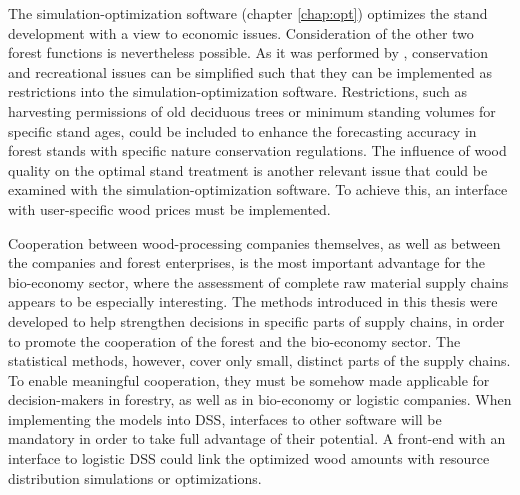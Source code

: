 The si\-mu\-la\-tion-op\-ti\-mi\-za\-tion software (chapter \ref{chap:opt}) optimizes the stand development with a view to economic issues. Consideration of the other two forest functions is nevertheless possible. As it was performed by \citet{yousefpour_2009}, conservation and recreational issues can be simplified such that they can be implemented as restrictions into the si\-mu\-la\-tion-op\-ti\-mi\-za\-tion software. Restrictions, such as harvesting permissions of old deciduous trees or minimum standing volumes for specific stand ages, could be included to enhance the forecasting accuracy in forest stands with specific nature conservation regulations. The influence of wood quality on the optimal stand treatment is another relevant issue that could be examined with the si\-mu\-la\-tion-op\-ti\-mi\-za\-tion software. To achieve this, an interface with user-specific wood prices must be implemented.

Cooperation between wood-processing companies themselves, as well as between the companies and forest enterprises, is the most important advantage for the bio-economy sector, where the assessment of complete raw material supply chains appears to be especially interesting. The methods introduced in this thesis were developed to help strengthen decisions in specific parts of supply chains, in order to promote the cooperation of the forest and the bio-economy sector. The statistical methods, however, cover only small, distinct parts of the supply chains. To enable meaningful cooperation, they must be somehow made applicable for decision-makers in forestry, as well as in bio-economy or logistic companies. When implementing the models into DSS, interfaces to other software will be mandatory in order to take full advantage of their potential. A front-end with an interface to logistic DSS could link the optimized wood amounts with resource distribution simulations or optimizations.
